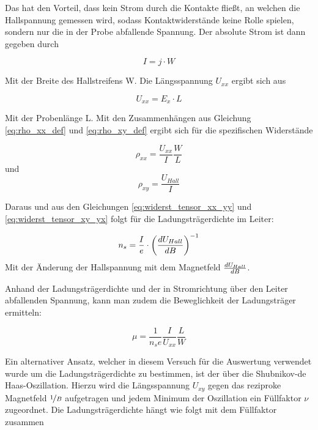 Das hat den Vorteil, dass kein Strom durch die Kontakte fließt, an welchen die Hallspannung gemessen wird, sodass Kontaktwiderstände keine Rolle spielen, sondern nur die in der Probe abfallende Spannung. Der absolute Strom ist dann gegeben durch

\begin{equation}
I=j \cdot W
\label{eq:absoluter_Strom}
\end{equation}

Mit der Breite des Hallstreifens W. Die Längsspannung $U_{xx}$ ergibt sich aus

\begin{equation}
U_{xx}=E_x \cdot L
\label{eq:laengsspannung}
\end{equation}

Mit der Probenlänge L. Mit den Zusammenhängen aus Gleichung \ref{eq:rho_xx_def} und \ref{eq:rho_xy_def} ergibt sich für die spezifischen Widerstände

\begin{equation}
\rho_{xx}=\frac{U_{xx}}{I}\frac{W}{L}
\label{eq:rho_xx}
\end{equation}
und
\begin{equation}
\rho_{xy}=\frac{U_{Hall}}{I}
\label{eq:rho_xy}
\end{equation}

Daraus und aus den Gleichungen \ref{eq:widerst_tensor_xx_yy} und \ref{eq:widerst_tensor_xy_yx} folgt für die Ladungsträgerdichte im Leiter:
 
 \begin{equation}
 n_s=\frac{I}{e} \cdot \left( \frac{d U_{Hall}}{d B} \right)^{-1}
 \label{eq:ladungsdichte_steig}
 \end{equation}
 Mit der Änderung der Hallspannung mit dem Magnetfeld $\frac{d U_{Hall}}{d B}$. 
 
 Anhand der Ladungsträgerdichte und der in Stromrichtung über den Leiter abfallenden Spannung, kann man zudem die Beweglichkeit der Ladungsträger ermitteln:
 
 \begin{equation}
 \mu=\frac{1}{n_se}\frac{I}{U_{xx}}\frac{L}{W}
 \label{eq:bewegl_masse}
 \end{equation}
 
 Ein alternativer Ansatz, welcher in diesem Versuch für die Auswertung verwendet wurde um die Ladungsträgerdichte zu bestimmen, ist der über die Shubnikov-de Haas-Oszillation. Hierzu wird die Längsspannung $U_{xy}$ gegen das reziproke Magnetfeld $\nicefrac{1}{B}$ aufgetragen und jedem Minimum der Oszillation ein Füllfaktor $\nu$ zugeordnet. Die Ladungsträgerdichte hängt wie folgt mit dem Füllfaktor zusammen
 
